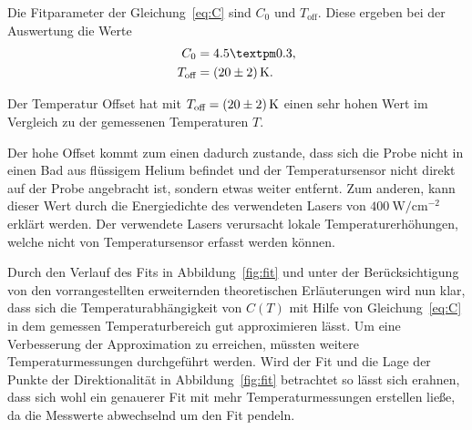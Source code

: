 Die Fitparameter der Gleichung~\ref{eq:C} sind $C_0$ und $T_\text{off}$.
Diese ergeben bei der Auswertung die Werte 
\begin{align}
    C_0 & = 4.5 ± 0.3, \\
    T_\text{off} & = \SI{ 20 \pm 2}{\kelvin}.
\end{align}

Der Temperatur Offset hat mit $T_\text{off} = \SI{ 20 \pm 2}{\kelvin}$ einen sehr hohen Wert
im Vergleich zu der gemessenen Temperaturen $T$.

Der hohe Offset kommt zum einen dadurch zustande, dass sich die Probe nicht in einen Bad aus flüssigem Helium befindet
und der Temperatursensor nicht direkt auf der Probe angebracht ist, sondern etwas weiter entfernt. 
Zum anderen, kann dieser Wert durch die Energiedichte des verwendeten Lasers von $\SI{400}{\watt\per\centi\meter^{-2}}$
erklärt werden.
Der verwendete Lasers verursacht lokale Temperaturerhöhungen, welche nicht 
von Temperatursensor erfasst werden können.

Durch den Verlauf des Fits in Abbildung~\ref{fig:fit} und unter der Berücksichtigung von den
vorrangestellten erweiternden theoretischen Erläuterungen wird nun klar, dass
sich die Temperaturabhängigkeit von $C(T)$ mit Hilfe von Gleichung~\ref{eq:C} in dem
gemessen Temperaturbereich gut approximieren lässt.
Um eine Verbesserung der Approximation zu erreichen, müssten weitere Temperaturmessungen 
durchgeführt werden. 
Wird der Fit und die Lage der Punkte der Direktionalität in Abbildung~\ref{fig:fit} betrachtet so
lässt sich erahnen, dass sich wohl ein genauerer Fit mit mehr Temperaturmessungen erstellen ließe,
da die Messwerte abwechselnd um den Fit pendeln.